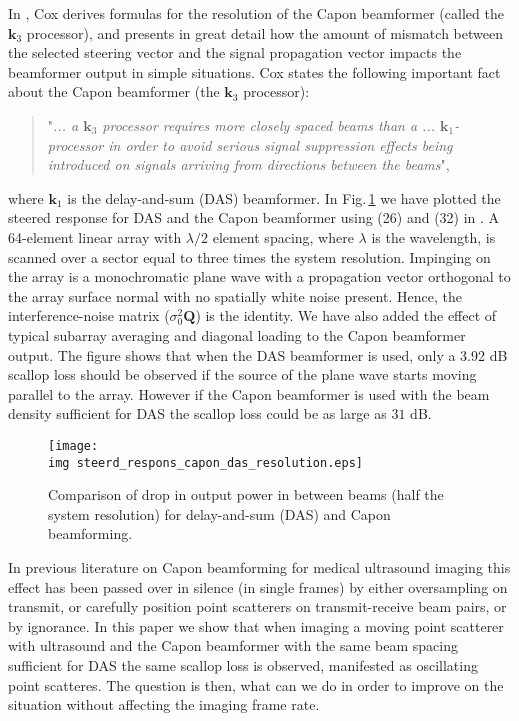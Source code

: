 \documentclass[journal]{IEEEtran}
\newcommand{\mat}[1]{\mathbf{#1}}
\renewcommand{\vec}[1]{\mathbf{#1}}
\newcommand{\img}{img/}
\begin{document}
In \cite{Cox1973}, Cox derives formulas for the resolution of the Capon beamformer (called the $\vec{k}_3$ processor), and presents in great detail how the amount of mismatch between the selected steering vector and the signal propagation vector impacts the beamformer output in simple situations. Cox states the following important fact about the Capon beamformer (the $\vec{k}_3$ processor): 
\begin{quote}
"\textit{... a $\vec{k}_3$ processor requires more closely spaced beams than a ... $\vec{k}_1$-processor in order to avoid serious signal suppression effects being introduced on signals arriving from directions between the beams}", 
\end{quote}
where $\vec{k}_1$ is the delay-and-sum (DAS) beamformer. In Fig.\,\ref{fig:das_capon_beams} we have plotted the steered response for DAS and the Capon beamformer using (26) and (32) in \cite{Cox1973}. A 64-element linear array with $\lambda/2$ element spacing, where $\lambda$ is the wavelength, is scanned over a sector equal to three times the system resolution. Impinging on the array is a monochromatic plane wave with a propagation vector orthogonal to the array surface normal with no spatially white noise present. Hence, the interference-noise matrix ($\sigma_0^2\mat{Q}$) is the identity. We have also added the effect of typical subarray averaging and diagonal loading \cite{Asen} to the Capon beamformer output. The figure shows that when the DAS beamformer is used, only a 3.92 dB scallop loss \cite{Harris1978} should be observed if the source of the plane wave starts moving parallel to the array. However if the Capon beamformer is used with the beam density sufficient for DAS the scallop loss could be as large as $31$ dB. 

\begin{figure}[!t]
\centerline{
\texttt{[image: \\img steerd\_respons\_capon\_das\_resolution.eps]}
}
\caption{Comparison of drop in output power in between beams (half the system resolution) for delay-and-sum (DAS) and Capon beamforming.}
\label{fig:das_capon_beams}
\end{figure}

In previous literature on Capon beamforming for medical ultrasound imaging this effect has been passed over in silence (in single frames) by either oversampling on transmit, or carefully position point scatterers on transmit-receive beam pairs, or by ignorance. In this paper we show that when imaging a moving point scatterer with ultrasound and the Capon beamformer with the same beam spacing sufficient for DAS the same scallop loss is observed, manifested as oscillating point scatteres. The question is then, what can we do in order to improve on the situation without affecting the imaging frame rate.
\end{document}
